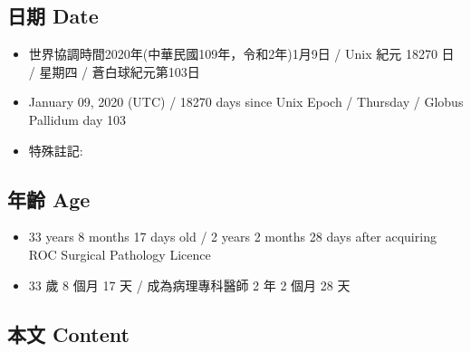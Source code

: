 \documentclass[a5paper, 12pt
]{book}
\providecommand{\tightlist}{%
  \setlength{\itemsep}{0pt}\setlength{\parskip}{0pt}}
\begin{document}
\hypertarget{ux65e5ux671f-date-39}{%
\subsection{日期 Date}\label{ux65e5ux671f-date-39}}

\begin{itemize}
\tightlist
\item
  世界協調時間2020年(中華民國109年，令和2年)1月9日 / Unix 紀元 18270 日
  / 星期四 / 蒼白球紀元第103日
\item
  January 09, 2020 (UTC) / 18270 days since Unix Epoch / Thursday /
  Globus Pallidum day 103
\item
  特殊註記:
\end{itemize}

\hypertarget{ux5e74ux9f61-age-39}{%
\subsection{年齡 Age}\label{ux5e74ux9f61-age-39}}

\begin{itemize}
\tightlist
\item
  33 years 8 months 17 days old / 2 years 2 months 28 days after
  acquiring ROC Surgical Pathology Licence
\item
  33 歲 8 個月 17 天 / 成為病理專科醫師 2 年 2 個月 28 天
\end{itemize}

\hypertarget{ux672cux6587-content-39}{%
\subsection{本文 Content}\label{ux672cux6587-content-39}}
\end{document}
